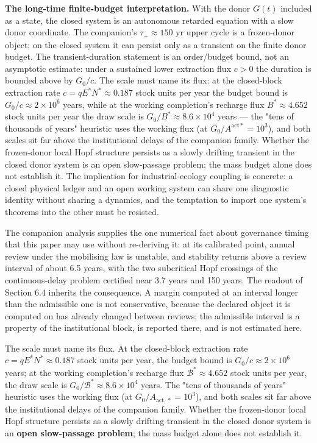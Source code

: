 \documentclass[11pt]{article}
\begin{document}
\textbf{The long-time finite-budget interpretation.} With the donor \(G(t)\) included as a state, the closed system is an autonomous retarded equation with a slow donor coordinate. The companion's \(\tau_+ \approx 150\) yr upper cycle is a frozen-donor object; on the closed system it can persist only as a transient on the finite donor budget. The transient-duration statement is an order/\allowbreak{}budget bound, not an asymptotic estimate: under a sustained lower extraction flux \(c > 0\) the duration is bounded above by \(G_0/\allowbreak{}c\). The scale must name its flux: at the closed-block extraction rate \(c = qE^*N^* \approx 0.187\) stock units per year the budget bound is \(G_0/\allowbreak{}c \approx 2 \times 10^6\) years, while at the working completion's recharge flux \(B^* \approx 4.652\) stock units per year the draw scale is \(G_0/\allowbreak{}B^* \approx 8.6 \times 10^4\) years --- the "tens of thousands of years" heuristic uses the working flux (at \(G_0/\allowbreak{}A^{\mathrm{act}*} =\allowbreak{} 10^3\)), and both scales sit far above the institutional delays of the companion family. Whether the frozen-donor local Hopf structure persists as a slowly drifting transient in the closed donor system is an open slow-passage problem; the mass budget alone does not establish it. The implication for industrial-ecology coupling is concrete: a closed physical ledger and an open working system can share one diagnostic identity without sharing a dynamics, and the temptation to import one system's theorems into the other must be resisted.

The companion analysis supplies the one numerical fact about governance timing that this paper may use without re-deriving it: at its calibrated point, annual review under the mobilising law is unstable, and stability returns above a review interval of about 6.5 years, with the two subcritical Hopf crossings of the continuous-delay problem certified near 3.7 years and 150 years. The readout of Section 6.4 inherits the consequence. A margin computed at an interval longer than the admissible one is not conservative, because the declared object it is computed on has already changed between reviews; the admissible interval is a property of the institutional block, is reported there, and is not estimated here.

\vspace{0.8em}

The scale must name its flux. At the closed-block extraction rate \(c=qE^*N^*\approx0.187\) stock units per year, the budget bound is \(G_0/\allowbreak{}c\approx2\times10^{6}\) years; at the working completion's recharge flux \(\mathcal B^*\approx4.652\) stock units per year, the draw scale is \(G_0/\mathcal B^*\approx8.6\times10^{4}\) years. The "tens of thousands of years" heuristic uses the working flux (at \(G_0/\allowbreak{}A_{\mathrm{act},\allowbreak{}*}=\allowbreak{}10^3\)), and both scales sit far above the institutional delays of the companion family. Whether the frozen-donor local Hopf structure persists as a slowly drifting transient in the closed donor system is an \textbf{open slow-passage problem}; the mass budget alone does not establish it.
\end{document}
